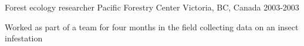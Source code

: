 \begin{cventries}



\cventry
{Forest ecology researcher} %
{Pacific Forestry Center} %
{Victoria, BC, Canada} %
{2003-2003} %
{ %
\begin{cvitems}
\item {Worked as part of a team for four months in the field collecting data on an insect infestation}
\end{cvitems}
}
\end{cventries}
